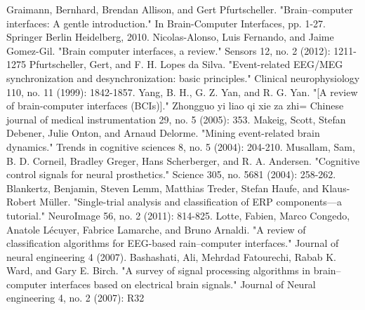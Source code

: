 %
%
\begin{thebibliography}{99}

Graimann, Bernhard, Brendan Allison, and Gert Pfurtscheller. "Brain–computer interfaces: A gentle introduction." In Brain-Computer Interfaces, pp. 1-27. Springer Berlin Heidelberg, 2010.
Nicolas-Alonso, Luis Fernando, and Jaime Gomez-Gil. "Brain computer interfaces, a review." Sensors 12, no. 2 (2012): 1211-1275
Pfurtscheller, Gert, and F. H. Lopes da Silva. "Event-related EEG/MEG synchronization and desynchronization: basic principles." Clinical neurophysiology 110, no. 11 (1999): 1842-1857.
Yang, B. H., G. Z. Yan, and R. G. Yan. "[A review of brain-computer interfaces (BCIs)]." Zhongguo yi liao qi xie za zhi= Chinese journal of medical instrumentation 29, no. 5 (2005): 353. 
Makeig, Scott, Stefan Debener, Julie Onton, and Arnaud Delorme. "Mining event-related brain dynamics." Trends in cognitive sciences 8, 
no. 5 (2004): 204-210.
Musallam, Sam, B. D. Corneil, Bradley Greger, Hans Scherberger, and R. A. Andersen. "Cognitive control signals for neural prosthetics." Science 305, no. 5681 (2004): 258-262.
Blankertz, Benjamin, Steven Lemm, Matthias Treder, Stefan Haufe, and Klaus-Robert Müller. "Single-trial analysis and classification of ERP components—a tutorial." NeuroImage 56, no. 2 (2011): 814-825.
Lotte, Fabien, Marco Congedo, Anatole Lécuyer, Fabrice Lamarche, and Bruno Arnaldi. "A review of classification algorithms for EEG-based  rain–computer interfaces." Journal of neural engineering 4 (2007).
Bashashati, Ali, Mehrdad Fatourechi, Rabab K. Ward, and Gary E. Birch. "A survey of signal processing algorithms in brain–computer interfaces based on electrical brain signals." Journal of Neural engineering 4, no. 2 (2007): R32


\end{thebibliography}
